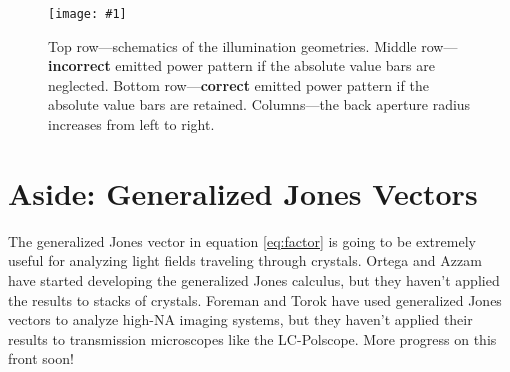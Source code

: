 \documentclass[11pt]{article}
\providecommand{\fig}[4]{
\begin{figure}[h]
 \captionsetup{width=1.0\linewidth}
 \centering
 \texttt{[image: \#1]}
 \caption{#3}
 \label{fig:#4}
\end{figure}
}
\begin{document}
\fig{../figures/compare_illum}{1.0}{Top row---schematics of the illumination
  geometries. Middle row---\textbf{incorrect} emitted power pattern if the absolute value bars are neglected. Bottom row---\textbf{correct} emitted power pattern if the absolute value bars are retained. Columns---the back aperture radius increases from left to right.}{illum}

\section{Aside: Generalized Jones Vectors}
The generalized Jones vector in equation \ref{eq:factor} is going to be extremely
useful for analyzing light fields traveling through crystals. Ortega
\cite{ortega} and Azzam \cite{azzam} have started developing the generalized
Jones calculus, but they haven't applied the results to stacks of
crystals. Foreman and Torok \cite{foreman} have used generalized Jones vectors
to analyze high-NA imaging systems, but they haven't applied their results to
transmission microscopes like the LC-Polscope. More progress on this front soon!

{}

\end{document}

